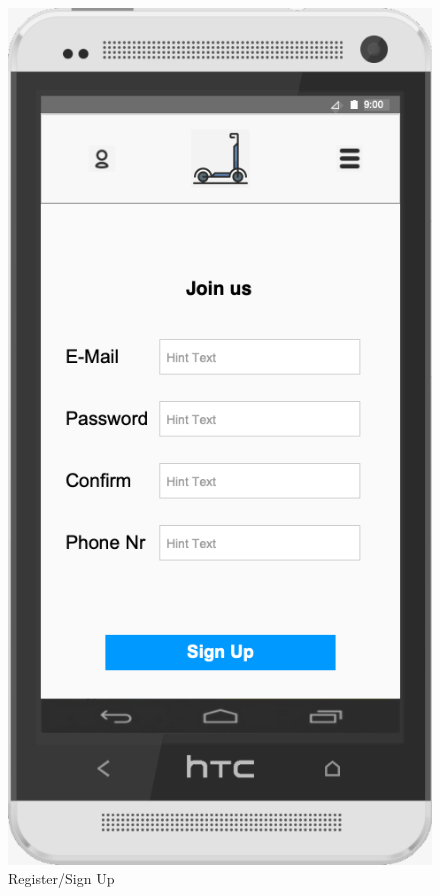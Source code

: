 \documentclass[a4paper, 12pt]{article}
\begin{document}
\begin{figure} [htbp]
  \begin{center}
    \includegraphics[scale=0.6]{05-register-sign-up.png}
  \end{center}
  \caption{Register/Sign Up}
\end{figure}
\end{document}
